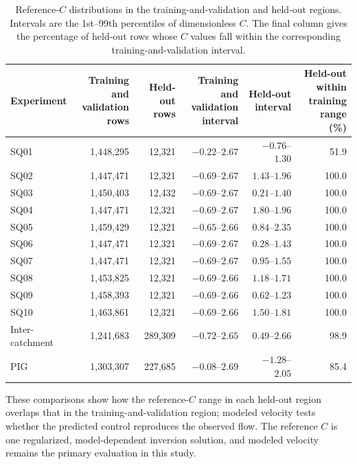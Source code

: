 \documentclass[review,jog]{igs}
\providecommand{\toprule}{\hline}
\providecommand{\midrule}{\hline}
\providecommand{\bottomrule}{\hline}
\begin{document}
\begin{table}
\caption{Reference-$C$ distributions in the training-and-validation and held-out regions. Intervals are the 1st--99th percentiles of dimensionless $C$. The final column gives the percentage of held-out rows whose $C$ values fall within the corresponding training-and-validation interval.}
\label{tab:target_distributions}
\centering\scriptsize
\setlength{\tabcolsep}{3pt}
\begin{tabular}{lrrrrr}
\toprule
Experiment & \shortstack{Training and\\validation rows} & Held-out rows &
\shortstack{Training and\\validation interval} & Held-out interval &
\shortstack{Held-out within\\training range (\%)}\\
\midrule
SQ01 & 1,448,295 & 12,321 & $-0.22$--$2.67$ & $-0.76$--$1.30$ & 51.9\\
SQ02 & 1,447,471 & 12,321 & $-0.69$--$2.67$ & $1.43$--$1.96$ & 100.0\\
SQ03 & 1,450,403 & 12,432 & $-0.69$--$2.67$ & $0.21$--$1.40$ & 100.0\\
SQ04 & 1,447,471 & 12,321 & $-0.69$--$2.67$ & $1.80$--$1.96$ & 100.0\\
SQ05 & 1,459,429 & 12,321 & $-0.65$--$2.66$ & $0.84$--$2.35$ & 100.0\\
SQ06 & 1,447,471 & 12,321 & $-0.69$--$2.67$ & $0.28$--$1.43$ & 100.0\\
SQ07 & 1,447,471 & 12,321 & $-0.69$--$2.67$ & $0.95$--$1.55$ & 100.0\\
SQ08 & 1,453,825 & 12,321 & $-0.69$--$2.66$ & $1.18$--$1.71$ & 100.0\\
SQ09 & 1,458,393 & 12,321 & $-0.69$--$2.66$ & $0.62$--$1.23$ & 100.0\\
SQ10 & 1,463,861 & 12,321 & $-0.69$--$2.66$ & $1.50$--$1.81$ & 100.0\\
Inter-catchment & 1,241,683 & 289,309 & $-0.72$--$2.65$ & $0.49$--$2.66$ & 98.9\\
PIG & 1,303,307 & 227,685 & $-0.08$--$2.69$ & $-1.28$--$2.05$ & 85.4\\
\bottomrule
\end{tabular}
\end{table}

These comparisons show how the reference-$C$ range in each held-out region overlaps that in the training-and-validation region; modeled velocity tests whether the predicted control reproduces the observed flow. The reference $C$ is one regularized, model-dependent inversion solution, and modeled velocity remains the primary evaluation in this study.
\end{document}
